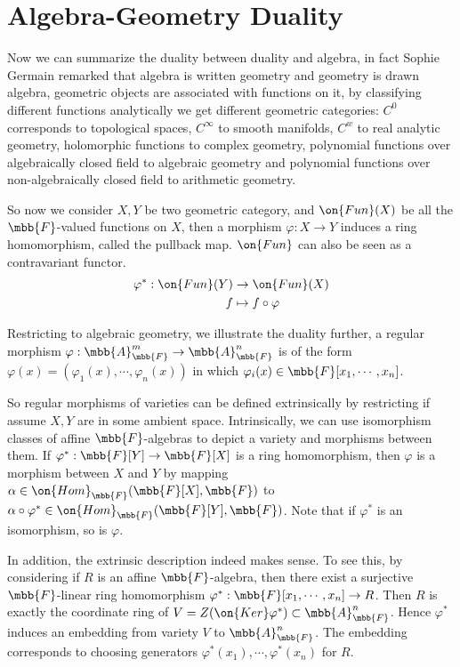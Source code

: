\documentclass[12pt]{article}
\begin{document}
\section{Algebra-Geometry Duality}


Now we can summarize the duality between duality and algebra, in fact Sophie Germain remarked that algebra is written geometry and geometry is drawn algebra, geometric objects are associated with functions on it, by classifying different functions analytically we get different geometric categories: $C^0$ corresponds to topological spaces, $C^{\infty}$ to smooth manifolds, $C^{w}$ to real analytic geometry, holomorphic functions to complex geometry, polynomial functions over algebraically closed field to algebraic geometry and polynomial functions over non-algebraically closed field to arithmetic geometry.
 
So now we consider $X,Y$ be two geometric category, and $\on{Fun}(X)$ be all the $\mbb{F}$-valued functions on $X$, then a morphism $\varphi:X\rightarrow Y$ induces a ring homomorphism, called the pullback map. $\on{Fun}$ can also be seen as a contravariant functor.
\begin{align*}
\varphi^*:\on{Fun}(Y)&\rightarrow\on{Fun}(X)\\
f&\mapsto f\circ\varphi
\end{align*}

Restricting to algebraic geometry, we illustrate the duality further, a regular morphism $\varphi:\mbb{A}_{\mbb{F}}^m\rightarrow\mbb{A}_{\mbb{F}}^n$ is of the form $\varphi(x)=(\varphi_1(x),\cdots,\varphi_n(x))$ in which $\varphi_{i}(x)\in\mbb{F}[x_1,\cdots,x_n]$.
 
So regular morphisms of varieties can be defined extrinsically by restricting if assume $X,Y$ are in some ambient space. Intrinsically, we can use isomorphism classes of affine $\mbb{F}$-algebras to depict a variety and morphisms between them. If $\varphi^*:\mbb{F}[Y]\rightarrow\mbb{F}[X]$ is a ring homomorphism, then $\varphi$ is a morphism between $X$ and $Y$ by mapping $\alpha\in\on{Hom}_{\mbb{F}}(\mbb{F}[X],\mbb{F})$ to $\alpha\circ\varphi^*\in\on{Hom}_{\mbb{F}}(\mbb{F}[Y],\mbb{F})$. Note that if $\varphi^*$ is an isomorphism, so is $\varphi$.
 
In addition, the extrinsic description indeed makes sense. To see this, by considering if $R$ is an affine $\mbb{F}$-algebra, then there exist a surjective $\mbb{F}$-linear ring homomorphism $\varphi^*:\mbb{F}[x_1,\cdots,x_n]\rightarrow R$. Then $R$ is exactly the coordinate ring of $V=Z(\on{Ker}\varphi^*)\subset\mbb{A}_{\mbb{F}}^n$. Hence $\varphi^*$ induces an embedding from variety $V$ to $\mbb{A}_{\mbb{F}}^n$. The embedding corresponds to choosing generators $\varphi^*(x_1),\cdots,\varphi^*(x_n)$ for $R$.
\end{document}
